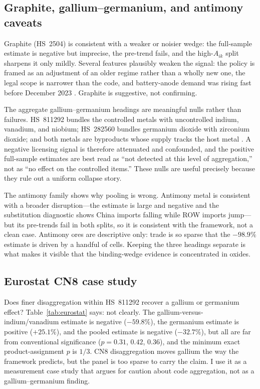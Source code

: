 \documentclass[12pt,a4paper]{article}
\begin{document}
\subsection{Graphite, gallium--germanium, and antimony caveats}\label{sec:caveats}

Graphite (HS~2504) is consistent with a weaker or noisier wedge: the full-sample
estimate is negative but imprecise, the pre-trend fails, and the high-$A_{ik}$
split sharpens it only mildly. Several features plausibly weaken the signal: the
policy is framed as an adjustment of an older regime rather than a wholly new
one, the legal scope is narrower than the code, and battery-anode demand was
rising fast before December 2023 \citep{park2025graphite_supply_chain,
usgs_2026_graphite_natural}. Graphite is suggestive, not confirming.

The aggregate gallium--germanium headings are meaningful nulls rather than
failures. HS~811292 bundles the controlled metals with uncontrolled indium,
vanadium, and niobium; HS~282560 bundles germanium dioxide with zirconium
dioxide; and both metals are byproducts whose supply tracks the host metal
\citep{frenzel2017byproduct_metals, usgs_2026_gallium, usgs_2026_germanium}. A
negative licensing signal is therefore attenuated and confounded, and the
positive full-sample estimates are best read as ``not detected at this level of
aggregation,'' not as ``no effect on the controlled items.'' These nulls are
useful precisely because they rule out a uniform collapse story.

The antimony family shows why pooling is wrong. Antimony metal is consistent with
a broader disruption---the estimate is large and negative and the substitution
diagnostic shows China imports falling while ROW imports jump---but its
pre-trends fail in both splits, so it is consistent with the framework, not a
clean case.
Antimony ores are descriptive only: trade is so sparse that the $-98.9\%$
estimate is driven by a handful of cells. Keeping the three headings separate is
what makes it visible that the binding-wedge evidence is concentrated in oxides.

\subsection{Eurostat CN8 case study}\label{sec:eurostat}

Does finer disaggregation within HS~811292 recover a gallium or germanium effect?
Table~\ref{tab:eurostat} says: not clearly. The gallium-versus-indium/vanadium
estimate is negative ($-59.8\%$), the germanium estimate is positive ($+25.1\%$),
and the pooled estimate is negative ($-32.7\%$), but all are far from
conventional significance ($p=0.31$, $0.42$, $0.36$), and the minimum exact
product-assignment $p$ is $1/3$. CN8 disaggregation moves gallium the way the
framework predicts, but the panel is too sparse to carry the claim. I use it as a
measurement case study that argues for caution about code aggregation, not as a
gallium--germanium finding.
\end{document}
